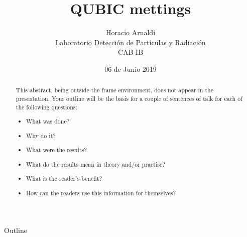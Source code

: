 \documentclass[ignorenonframetext,12pt]{beamer}
\title{QUBIC mettings}
\author{Horacio Arnaldi\\
Laboratorio Detecci\'on de Part\'iculas y Radiaci\'on\\
CAB-IB}
\date{06 de Junio 2019}
\begin{document}
\begin{frame}
				\maketitle
\end{frame}


\begin{abstract}
				This abstract, being outside the frame environment, does not appear in the presentation.  Your outline will be the basis for a couple of sentences of talk for each of the following questions:
				\begin{itemize}
								\item What was done?
								\item Why do it?
								\item What were the results?
								\item What do the results mean in theory and/or practise?
								\item What is the reader's benefit?
								\item How can the readers use this information for themselves? 
				\end{itemize}
\end{abstract}


\begin{frame}{Outline}
				\tableofcontents
\end{frame}
\end{document}
